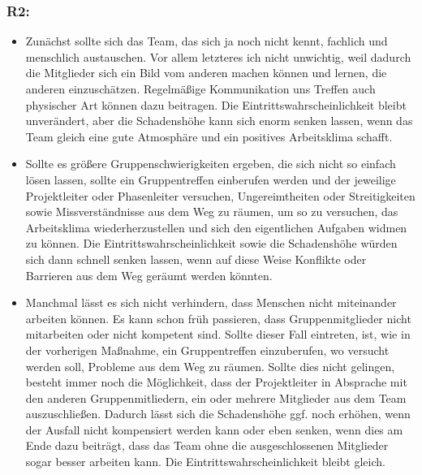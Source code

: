 \documentclass{swp1}
\begin{document}
\subsubsection*{R2:}
\begin{itemize}
\item Zunächst sollte sich das Team, das sich ja noch nicht kennt, fachlich und menschlich austauschen. Vor allem letzteres ich nicht unwichtig, weil dadurch die Mitglieder sich ein Bild vom anderen machen können und lernen, die anderen einzuschätzen. Regelmäßige Kommunikation uns Treffen auch physischer Art können dazu beitragen. Die Eintrittswahrscheinlichkeit bleibt unverändert, aber die Schadenshöhe kann sich enorm senken lassen, wenn das Team gleich eine gute Atmosphäre und ein positives Arbeitsklima schafft.
\item Sollte es größere Gruppenschwierigkeiten ergeben, die sich nicht so einfach lösen lassen, sollte ein Gruppentreffen einberufen werden und der jeweilige Projektleiter oder Phasenleiter versuchen, Ungereimtheiten oder Streitigkeiten sowie Missverständnisse aus dem Weg zu räumen, um so zu versuchen, das Arbeitsklima wiederherzustellen und sich den eigentlichen Aufgaben widmen zu können. Die Eintrittswahrscheinlichkeit sowie die Schadenshöhe würden sich dann schnell senken lassen, wenn auf diese Weise Konflikte oder Barrieren aus dem Weg geräumt werden könnten.
\item Manchmal lässt es sich nicht verhindern, dass Menschen nicht miteinander arbeiten können. Es kann schon früh passieren, dass Gruppenmitglieder nicht mitarbeiten oder nicht kompetent sind. Sollte dieser Fall eintreten, ist, wie in der vorherigen Maßnahme, ein Gruppentreffen einzuberufen, wo versucht werden soll, Probleme aus dem Weg zu räumen. Sollte dies nicht gelingen, besteht immer noch die Möglichkeit, dass der Projektleiter in Absprache mit den anderen Gruppenmitliedern, ein oder mehrere Mitglieder aus dem Team auszuschließen. Dadurch lässt sich die Schadenshöhe ggf. noch erhöhen, wenn der Ausfall nicht kompensiert werden kann oder eben senken, wenn dies am Ende dazu beiträgt, dass das Team ohne die ausgeschlossenen Mitglieder sogar besser arbeiten kann. Die Eintrittswahrscheinlichkeit bleibt gleich. 
\end{itemize}
\end{document}
